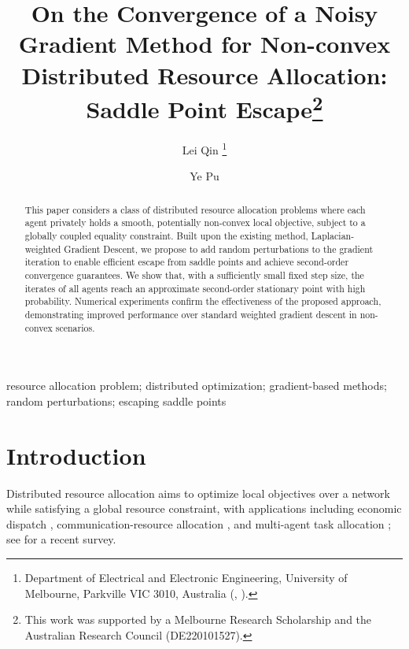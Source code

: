 \documentclass{siamart251216}
\title{On the Convergence of a Noisy Gradient Method for Non-convex Distributed Resource Allocation: Saddle Point Escape\thanks{This work was supported by a Melbourne Research Scholarship and the Australian Research Council (DE220101527).}}
\author{
Lei Qin
\thanks{Department of Electrical and Electronic Engineering, University of Melbourne,
Parkville VIC 3010, Australia
(\email{leqin@student.unimelb.edu.au}, \email{ye.pu@unimelb.edu.au}).}
\and
Ye Pu\footnotemark[2]
}
\begin{document}
\maketitle

\begin{abstract}
This paper considers a class of distributed resource allocation problems where each agent privately holds a smooth, potentially non-convex local objective, subject to a globally coupled equality constraint. Built upon the existing method, Laplacian-weighted Gradient Descent, we propose to add random perturbations to the gradient iteration to enable efficient escape from saddle points and achieve second-order convergence guarantees. We show that, with a sufficiently small fixed step size, the iterates of all agents reach an approximate second-order stationary point with high probability. Numerical experiments confirm the effectiveness of the proposed approach, demonstrating improved performance over standard weighted gradient descent in non-convex scenarios.
\end{abstract}

\begin{keywords}
resource allocation problem; distributed optimization; gradient-based methods; random perturbations; escaping saddle points
\end{keywords}


\section{Introduction}
\label{sec: Introduction}
Distributed resource allocation aims to optimize local objectives over a network while satisfying a global resource constraint, with applications including economic dispatch \cite{li2021distributed,yi2016initialization,wang2018distributed}, communication-resource allocation \cite{halabian2019distributed}, and multi-agent task allocation \cite{sayyaadi2010distributed}; see \cite{doostmohammadian2025survey} for a recent survey.
\end{document}
